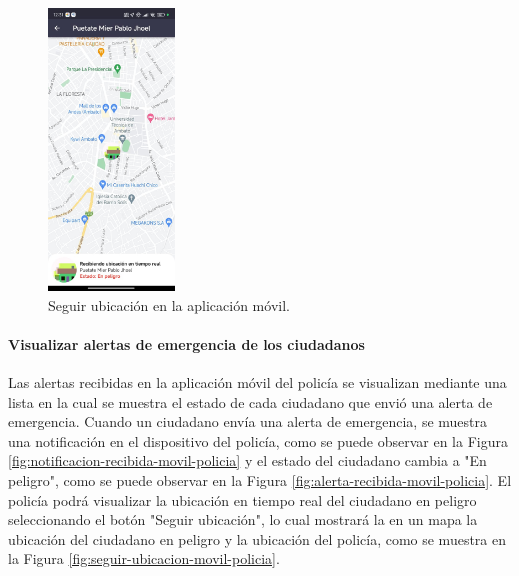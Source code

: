\begin{figure}[H]
    \centering
    \includegraphics[width=0.3\textwidth]{chapters/III-resultados-y-discusion/resources/images/seguir-ubicacion-movil.png}
    \caption{Seguir ubicación en la aplicación móvil.}
    \label{fig:seguir-ubicacion-movil}
\end{figure}

\paragraph{Visualizar alertas de emergencia de los ciudadanos}

Las alertas recibidas en la aplicación móvil del policía se visualizan mediante una lista en la cual se muestra el estado de cada
ciudadano que envió una alerta de emergencia. Cuando un ciudadano envía una alerta de emergencia, se muestra una notificación en el
dispositivo del policía, como se puede observar en la Figura \ref{fig:notificacion-recibida-movil-policia} y el estado del ciudadano
cambia a "En peligro", como se puede observar en la Figura \ref{fig:alerta-recibida-movil-policia}. El policía podrá visualizar la
ubicación en tiempo real del ciudadano en peligro seleccionando el botón "Seguir ubicación", lo cual mostrará la en un mapa la ubicación
del ciudadano en peligro y la ubicación del policía, como se muestra en la Figura \ref{fig:seguir-ubicacion-movil-policia}.

